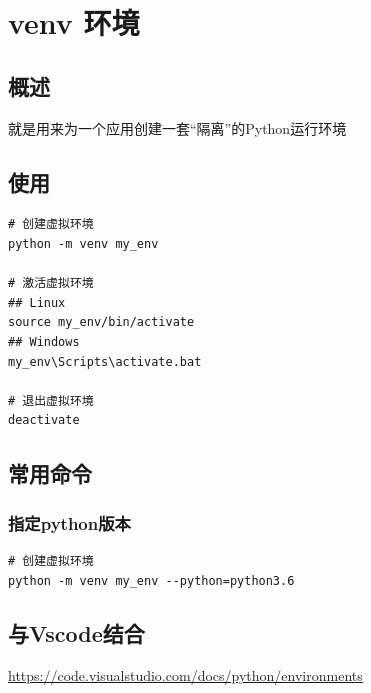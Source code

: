 \chapter{venv 环境}

\section{概述}
就是用来为一个应用创建一套“隔离”的Python运行环境

\section{使用}
\begin{lstlisting}[style=demostyle,numbers=none]
# 创建虚拟环境
python -m venv my_env

# 激活虚拟环境
## Linux
source my_env/bin/activate
## Windows
my_env\Scripts\activate.bat

# 退出虚拟环境
deactivate
\end{lstlisting}

\section{常用命令}
\subsection{指定python版本}
\begin{lstlisting}[style=demostyle,numbers=none]
# 创建虚拟环境
python -m venv my_env --python=python3.6
\end{lstlisting}

\section{与Vscode结合}
\url{https://code.visualstudio.com/docs/python/environments}
